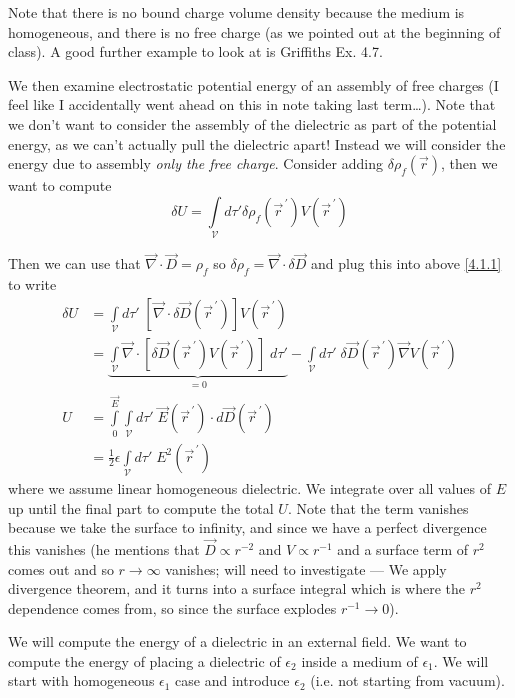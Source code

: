 \documentclass[10pt]{report}
\newcommand{\pvec}[1]{\vec{#1}^{\,\prime}}
\begin{document}
Note that there is no bound charge volume density because the medium is homogeneous, and there is no free charge (as we pointed out at the beginning of class). A good further example to look at is Griffiths Ex. 4.7.

We then examine electrostatic potential energy of an assembly of free charges (I feel like I accidentally went ahead on this in note taking last term\dots). Note that we don't want to consider the assembly of the dielectric as part of the potential energy, as we can't actually pull the dielectric apart! Instead we will consider the energy due to assembly \emph{only the free charge}. Consider adding $\delta \rho_f(\vec{r})$, then we want to compute
\begin{equation}
    \delta U = \int\limits_\mathcal{V} d\tau' \delta \rho_f(\pvec{r}) V(\pvec{r}) \label{4.1.1}
\end{equation}

Then we can use that $\vec{\nabla}\cdot \vec{D} = \rho_f$ so $\delta \rho_f = \vec{\nabla}\cdot \delta \vec{D}$ and plug this into above \eqref{4.1.1} to write
\begin{align}
    \delta U &= \int\limits_{\mathcal{V}}^{}d\tau'\;\left[ \vec{\nabla}\cdot \delta \vec{D}(\pvec{r}) \right]V(\pvec{r})\\
    &= \underbrace{\int\limits_{\mathcal{V}}^{}\vec{\nabla}\cdot \left[ \delta\vec{D}(\pvec{r})V(\pvec{r}) \right]\;d\tau'}_{= 0} - \int\limits_{\mathcal{V}}^{}d\tau'\;\delta\vec{D}(\pvec{r})\vec{\nabla}V(\pvec{r})\\
    U &= \int\limits_0^{\vec{E}}\int\limits_{\mathcal{V}}^{}d\tau'\;\vec{E}(\pvec{r})\cdot d\vec{D}(\pvec{r})\\
    &= \frac{1}{2}\epsilon \int\limits_{\mathcal{V}}^{}d\tau'\;E^2(\pvec{r})
\end{align}
where we assume linear homogeneous dielectric. We integrate over all values of $E$ up until the final part to compute the total $U$. Note that the term vanishes because we take the surface to infinity, and since we have a perfect divergence this vanishes (he mentions that $\vec{D} \propto r^{-2}$ and $V \propto r^{-1}$ and a surface term of $r^2$ comes out and so $r \to \infty$ vanishes; will need to investigate --- We apply divergence theorem, and it turns into a surface integral which is where the $r^2$ dependence comes from, so since the surface explodes $r^{-1} \to 0$).

We will compute the energy of a dielectric in an external field. We want to compute the energy of placing a dielectric of $\epsilon_2$ inside a medium of $\epsilon_1$. We will start with homogeneous $\epsilon_1$ case and introduce $\epsilon_2$ (i.e. not starting from vacuum).
\end{document}
